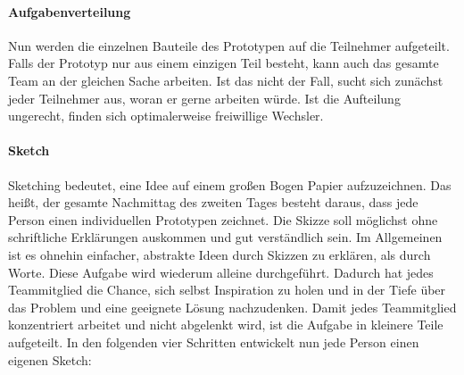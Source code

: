 \paragraph{Aufgabenverteilung}
Nun werden die einzelnen Bauteile des Prototypen auf die Teilnehmer aufgeteilt. Falls der Prototyp nur aus einem einzigen Teil besteht, kann auch das gesamte Team an der gleichen Sache arbeiten. Ist das nicht der Fall, sucht sich zunächst jeder Teilnehmer aus, woran er gerne arbeiten würde. Ist die Aufteilung ungerecht, finden sich optimalerweise freiwillige Wechsler.

\paragraph{Sketch}
Sketching bedeutet, eine Idee auf einem großen Bogen Papier aufzuzeichnen. Das heißt, der gesamte Nachmittag des zweiten Tages besteht daraus, dass jede Person einen individuellen Prototypen zeichnet. Die Skizze soll möglichst ohne schriftliche Erklärungen auskommen und gut verständlich sein. Im Allgemeinen ist es ohnehin einfacher, abstrakte Ideen durch Skizzen zu erklären, als durch Worte. Diese Aufgabe wird wiederum alleine durchgeführt. Dadurch hat jedes Teammitglied die Chance, sich selbst Inspiration zu holen und in der Tiefe über das Problem und eine geeignete Lösung nachzudenken. Damit jedes Teammitglied konzentriert arbeitet und nicht abgelenkt wird, ist die Aufgabe in kleinere Teile aufgeteilt. In den folgenden vier Schritten entwickelt nun jede Person einen eigenen Sketch:
